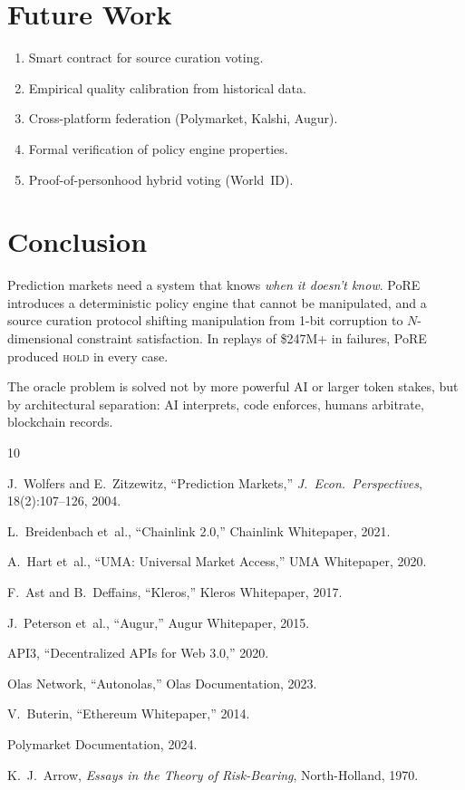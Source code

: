 \documentclass[11pt,a4paper,twocolumn]{article}
\begin{document}
\section{Future Work}

\begin{enumerate}[nosep]
    \item Smart contract for source curation voting.
    \item Empirical quality calibration from historical data.
    \item Cross-platform federation (Polymarket, Kalshi, Augur).
    \item Formal verification of policy engine properties.
    \item Proof-of-personhood hybrid voting (World~ID).
\end{enumerate}

\section{Conclusion}

Prediction markets need a system that knows \emph{when it doesn't know}. PoRE introduces a deterministic policy engine that cannot be manipulated, and a source curation protocol shifting manipulation from 1-bit corruption to $N$-dimensional constraint satisfaction. In replays of \$247M+ in failures, PoRE produced \textsc{hold} in every case.

The oracle problem is solved not by more powerful AI or larger token stakes, but by architectural separation: AI interprets, code enforces, humans arbitrate, blockchain records.


\begin{thebibliography}{10}

J.~Wolfers and E.~Zitzewitz, ``Prediction Markets,'' \emph{J.~Econ.~Perspectives}, 18(2):107--126, 2004.

L.~Breidenbach et~al., ``Chainlink 2.0,'' Chainlink Whitepaper, 2021.

A.~Hart et~al., ``UMA: Universal Market Access,'' UMA Whitepaper, 2020.

F.~Ast and B.~Deffains, ``Kleros,'' Kleros Whitepaper, 2017.

J.~Peterson et~al., ``Augur,'' Augur Whitepaper, 2015.

API3, ``Decentralized APIs for Web 3.0,'' 2020.

Olas Network, ``Autonolas,'' Olas Documentation, 2023.

V.~Buterin, ``Ethereum Whitepaper,'' 2014.

Polymarket Documentation, 2024.

K.~J.~Arrow, \emph{Essays in the Theory of Risk-Bearing}, North-Holland, 1970.

\end{thebibliography}
\end{document}
